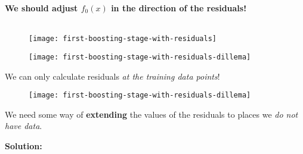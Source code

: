 \begin{frame}
  \begin{center}
    \textbf{We should adjust $f_0(x)$ in the direction of the residuals!}\\~\\
  \end{center}


  \begin{figure}
    \texttt{[image: first-boosting-stage-with-residuals]}
  \end{figure}
  
\end{frame}
%

\begin{frame}

  \begin{figure}
    \texttt{[image: first-boosting-stage-with-residuals-dillema]}
  \end{figure}
  
\end{frame}
%

\begin{frame}
We can only calculate residuals \textit{at the training data points}!

  \begin{figure}
    \texttt{[image: first-boosting-stage-with-residuals-dillema]}
  \end{figure}

We need some way of \textbf{extending} the values of the residuals to places we \textit{do not have data}.
\end{frame}
%

\begin{frame}
\textbf{Solution:}\\~\\


\end{frame}
%

